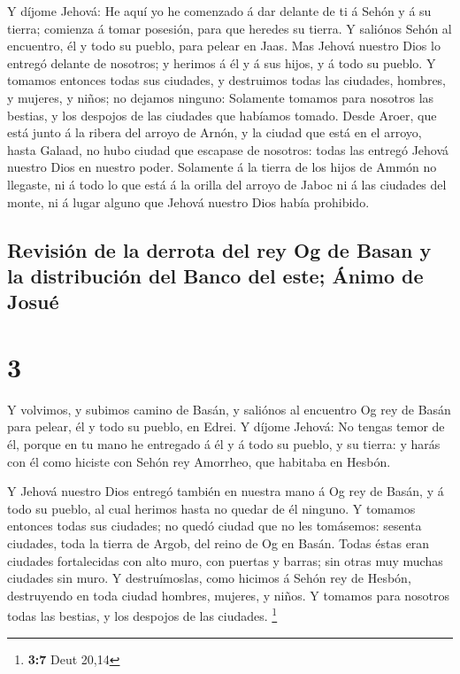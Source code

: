  Y díjome Jehová: He aquí yo he comenzado á dar delante de
ti á Sehón y á su tierra; comienza á tomar posesión, para que heredes su
tierra.  Y saliónos Sehón al encuentro, él y todo su
pueblo, para pelear en Jaas.  Mas Jehová nuestro Dios lo
entregó delante de nosotros; y herimos á él y á sus hijos, y á todo su
pueblo.  Y tomamos entonces todas sus ciudades, y
destruimos todas las ciudades, hombres, y mujeres, y niños; no dejamos
ninguno:  Solamente tomamos para nosotros las bestias, y
los despojos de las ciudades que habíamos tomado.  Desde
Aroer, que está junto á la ribera del arroyo de Arnón, y la ciudad que
está en el arroyo, hasta Galaad, no hubo ciudad que escapase de
nosotros: todas las entregó Jehová nuestro Dios en nuestro poder.
 Solamente á la tierra de los hijos de Ammón no llegaste,
ni á todo lo que está á la orilla del arroyo de Jaboc ni á las ciudades
del monte, ni á lugar alguno que Jehová nuestro Dios había prohibido.

\hypertarget{revisiuxf3n-de-la-derrota-del-rey-og-de-basan-y-la-distribuciuxf3n-del-banco-del-este-uxe1nimo-de-josuuxe9}{%
\subsection{Revisión de la derrota del rey Og de Basan y la distribución
del Banco del este; Ánimo de
Josué}\label{revisiuxf3n-de-la-derrota-del-rey-og-de-basan-y-la-distribuciuxf3n-del-banco-del-este-uxe1nimo-de-josuuxe9}}

\hypertarget{section-2}{%
\section{3}\label{section-2}}

 Y volvimos, y subimos camino de Basán, y saliónos al
encuentro Og rey de Basán para pelear, él y todo su pueblo, en Edrei.
 Y díjome Jehová: No tengas temor de él, porque en tu mano
he entregado á él y á todo su pueblo, y su tierra: y harás con él como
hiciste con Sehón rey Amorrheo, que habitaba en Hesbón.

 Y Jehová nuestro Dios entregó también en nuestra mano á Og
rey de Basán, y á todo su pueblo, al cual herimos hasta no quedar de él
ninguno.  Y tomamos entonces todas sus ciudades; no quedó
ciudad que no les tomásemos: sesenta ciudades, toda la tierra de Argob,
del reino de Og en Basán.  Todas éstas eran ciudades
fortalecidas con alto muro, con puertas y barras; sin otras muy muchas
ciudades sin muro.  Y destruímoslas, como hicimos á Sehón
rey de Hesbón, destruyendo en toda ciudad hombres, mujeres, y niños.
 Y tomamos para nosotros todas las bestias, y los despojos
de las ciudades. \footnote{\textbf{3:7} Deut 20,14}

